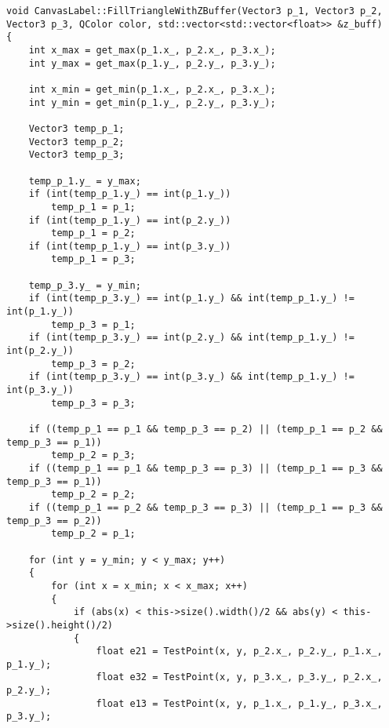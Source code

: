 \begin{lstlisting}[caption = Реализация общего алгоритма отрисовки, label = lst:zbuf]
void CanvasLabel::FillTriangleWithZBuffer(Vector3 p_1, Vector3 p_2, Vector3 p_3, QColor color, std::vector<std::vector<float>> &z_buff)
{
    int x_max = get_max(p_1.x_, p_2.x_, p_3.x_);
    int y_max = get_max(p_1.y_, p_2.y_, p_3.y_);

    int x_min = get_min(p_1.x_, p_2.x_, p_3.x_);
    int y_min = get_min(p_1.y_, p_2.y_, p_3.y_);

    Vector3 temp_p_1;
    Vector3 temp_p_2;
    Vector3 temp_p_3;

    temp_p_1.y_ = y_max;
    if (int(temp_p_1.y_) == int(p_1.y_))
        temp_p_1 = p_1;
    if (int(temp_p_1.y_) == int(p_2.y_))
        temp_p_1 = p_2;
    if (int(temp_p_1.y_) == int(p_3.y_))
        temp_p_1 = p_3;

    temp_p_3.y_ = y_min;
    if (int(temp_p_3.y_) == int(p_1.y_) && int(temp_p_1.y_) != int(p_1.y_))
        temp_p_3 = p_1;
    if (int(temp_p_3.y_) == int(p_2.y_) && int(temp_p_1.y_) != int(p_2.y_))
        temp_p_3 = p_2;
    if (int(temp_p_3.y_) == int(p_3.y_) && int(temp_p_1.y_) != int(p_3.y_))
        temp_p_3 = p_3;

    if ((temp_p_1 == p_1 && temp_p_3 == p_2) || (temp_p_1 == p_2 && temp_p_3 == p_1))
        temp_p_2 = p_3;
    if ((temp_p_1 == p_1 && temp_p_3 == p_3) || (temp_p_1 == p_3 && temp_p_3 == p_1))
        temp_p_2 = p_2;
    if ((temp_p_1 == p_2 && temp_p_3 == p_3) || (temp_p_1 == p_3 && temp_p_3 == p_2))
        temp_p_2 = p_1;

    for (int y = y_min; y < y_max; y++)
    {
        for (int x = x_min; x < x_max; x++)
        {
            if (abs(x) < this->size().width()/2 && abs(y) < this->size().height()/2)
            {
                float e21 = TestPoint(x, y, p_2.x_, p_2.y_, p_1.x_, p_1.y_);
                float e32 = TestPoint(x, y, p_3.x_, p_3.y_, p_2.x_, p_2.y_);
                float e13 = TestPoint(x, y, p_1.x_, p_1.y_, p_3.x_, p_3.y_);


\end{lstlisting}

